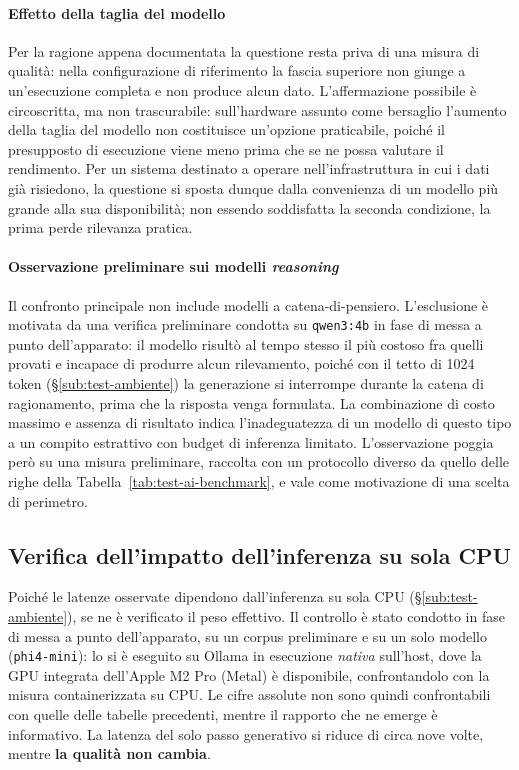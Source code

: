 \paragraph*{Effetto della taglia del modello} Per la ragione appena documentata la questione resta priva di una misura di qualità: nella configurazione di riferimento la fascia superiore non giunge a un'esecuzione completa e non produce alcun dato. L'affermazione possibile è circoscritta, ma non trascurabile: sull'hardware assunto come bersaglio l'aumento della taglia del modello non costituisce un'opzione praticabile, poiché il presupposto di esecuzione viene meno prima che se ne possa valutare il rendimento. Per un sistema destinato a operare nell'infrastruttura in cui i dati già risiedono, la questione si sposta dunque dalla convenienza di un modello più grande alla sua disponibilità; non essendo soddisfatta la seconda condizione, la prima perde rilevanza pratica.

\paragraph*{Osservazione preliminare sui modelli \emph{reasoning}} Il confronto principale non include modelli a catena-di-pensiero. L'esclusione è motivata da una verifica preliminare condotta su \texttt{qwen3:4b} in fase di messa a punto dell'apparato: il modello risultò al tempo stesso il più costoso fra quelli provati e incapace di produrre alcun rilevamento, poiché con il tetto di 1024 token (§\ref{sub:test-ambiente}) la generazione si interrompe durante la catena di ragionamento, prima che la risposta venga formulata. La combinazione di costo massimo e assenza di risultato indica l'inadeguatezza di un modello di questo tipo a un compito estrattivo con budget di inferenza limitato. L'osservazione poggia però su una misura preliminare, raccolta con un protocollo diverso da quello delle righe della Tabella~\ref{tab:test-ai-benchmark}, e vale come motivazione di una scelta di perimetro.

\subsection{Verifica dell'impatto dell'inferenza su sola CPU}
\label{sub:test-gpu}

Poiché le latenze osservate dipendono dall'inferenza su sola CPU (§\ref{sub:test-ambiente}), se ne è verificato il peso effettivo. Il controllo è stato condotto in fase di messa a punto dell'apparato, su un corpus preliminare e su un solo modello (\texttt{phi4-mini}): lo si è eseguito su Ollama in esecuzione \emph{nativa} sull'host, dove la GPU integrata dell'Apple M2 Pro (Metal) è disponibile, confrontandolo con la misura containerizzata su CPU. Le cifre assolute non sono quindi confrontabili con quelle delle tabelle precedenti, mentre il rapporto che ne emerge è informativo. La latenza del solo passo generativo si riduce di circa nove volte, mentre \textbf{la qualità non cambia}.


